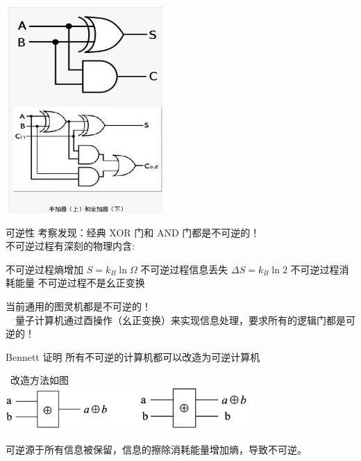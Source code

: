 \begin{frame} 
    \frametitle{}
\centering
\includegraphics[width=0.45\textwidth]{figs/10.png}
\end{frame} 

\begin{frame} {可逆性}
    考察发现：经典 XOR 门和 AND 门都是不可逆的！\\
    不可逆过程有深刻的物理内含:
    \begin{itemize}
        \IItem 不可逆过程熵增加 $S=k_B\ln\Omega$
        \IItem 不可逆过程信息丢失 $\Delta S=k_B\ln2 $
        \IItem 不可逆过程消耗能量
        \IItem 不可逆过程不是幺正变换
    \end{itemize}
    当前通用的图灵机都是不可逆的！ \\ \vspace{0.8em}
    {\Bullet}~~量子计算机通过酉操作（幺正变换）来实现信息处理，要求所有的逻辑门都是可逆的！\\
    
\end{frame}  

\begin{frame} 
    \begin{tcolorbox2}{Bennett 证明}
    所有不可逆的计算机都可以改造为可逆计算机
    \end{tcolorbox2}
    \解~改造方法如图 \\
    \includegraphics[width=0.7\textwidth]{figs/11.png}
    
    可逆源于所有信息被保留，信息的擦除消耗能量增加熵，导致不可逆。
\end{frame} 



